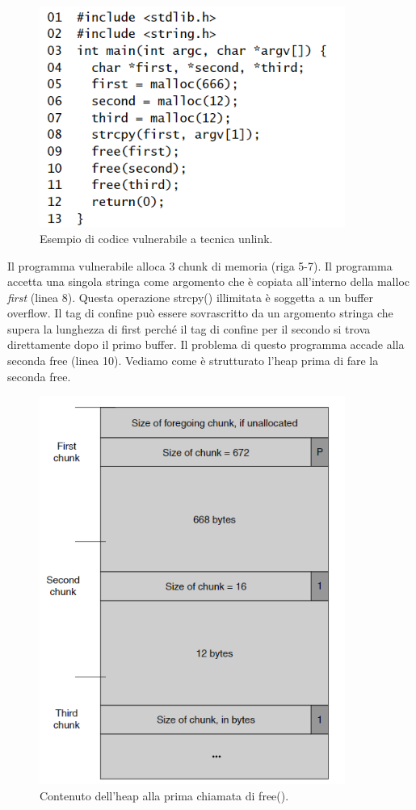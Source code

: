 \begin{figure}[H]
    \centering
    \includegraphics[width=10cm, keepaspectratio]{capitoli/secure_coding/img/cap_4/unlink_buff_over.png}
    \caption{Esempio di codice vulnerabile a tecnica unlink.}\label{fig:ulink_buff_over}
\end{figure}

Il programma vulnerabile alloca 3 chunk di memoria (riga 5-7). Il programma accetta
una singola stringa come argomento che è copiata all'interno della malloc \textit{first} (linea 8).
Questa operazione strcpy() illimitata è soggetta a un buffer overflow.
Il tag di confine può essere sovrascritto da un argomento stringa che supera la
lunghezza di first perché il tag di confine per il secondo si trova direttamente dopo
il primo buffer. Il problema di questo programma accade alla seconda free (linea 10).
Vediamo come è strutturato l'heap prima di fare la seconda free.

\begin{figure}[H]
    \centering
    \includegraphics[width=10cm, keepaspectratio]{capitoli/secure_coding/img/cap_4/heap_prima_free.png}
    \caption{Contenuto dell'heap alla prima chiamata di free().}\label{fig:heap_prima_free}
\end{figure}

